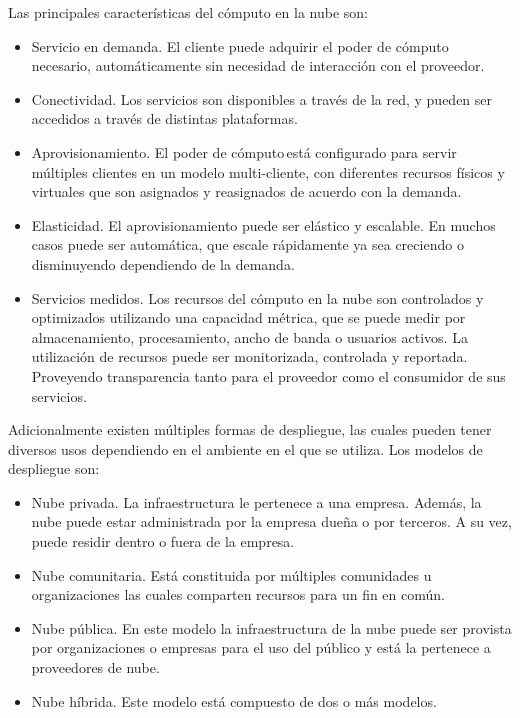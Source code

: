 \documentclass[12pt,twoside]{reedthesis}
\begin{document}
Las principales características del cómputo en la nube son:~
~
\begin{itemize}
\item
  Servicio en demanda. El cliente puede adquirir el poder de cómputo necesario, automáticamente sin necesidad de interacción con el proveedor.~
\item
  Conectividad. Los servicios son disponibles a través de la red, y pueden ser accedidos a través de distintas plataformas.~~
\item
  Aprovisionamiento. El poder de cómputo\,está configurado para servir múltiples clientes en un modelo multi-cliente, con diferentes recursos físicos y virtuales que son asignados y reasignados de acuerdo con la demanda.~
\item
  Elasticidad. El aprovisionamiento puede ser elástico y escalable. En muchos casos puede ser automática, que escale rápidamente ya sea creciendo o disminuyendo dependiendo de la demanda.~
\item
  Servicios medidos. Los recursos del cómputo en la nube son controlados y optimizados utilizando una capacidad métrica, que se puede medir por almacenamiento, procesamiento, ancho de banda o usuarios activos. La utilización de recursos puede ser monitorizada, controlada y reportada. Proveyendo transparencia tanto para el proveedor como el consumidor de sus servicios.~~
  ~
\end{itemize}
Adicionalmente existen múltiples formas de despliegue, las cuales pueden tener diversos usos dependiendo en el ambiente en el que se utiliza. Los modelos de despliegue son:~
\begin{itemize}
\item
  Nube privada. La infraestructura le pertenece a una empresa. Además, la nube puede estar administrada por la empresa dueña o por terceros. A su vez, puede residir dentro o fuera de la empresa.~
\item
  Nube comunitaria. Está constituida por múltiples comunidades u organizaciones las cuales comparten recursos para un fin en común.~
\item
  Nube pública. En este modelo la infraestructura de la nube puede ser provista por organizaciones o empresas para el uso del público y está la pertenece a proveedores de nube.~
\item
  Nube híbrida. Este modelo está compuesto de dos o más modelos.~
\end{itemize}
\end{document}
